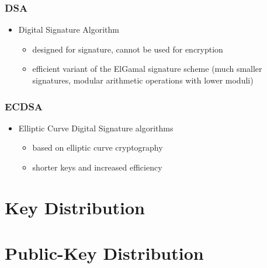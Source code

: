 \documentclass[draft]{article}
\begin{document}
\subsubsection*{DSA}
\begin{itemize}[nosep]
    \item Digital Signature Algorithm
          \begin{itemize}[nosep]
              \item designed for signature, cannot be used for encryption
              \item efficient variant of the ElGamal signature scheme (much smaller signatures, modular arithmetic operations with lower moduli)
          \end{itemize}
\end{itemize}
\subsubsection*{ECDSA}
\begin{itemize}
    \item Elliptic Curve Digital Signature algorithms
          \begin{itemize}[nosep]
              \item based on elliptic curve cryptography
              \item shorter keys and increased efficiency
          \end{itemize}
\end{itemize}
\section{Key Distribution}
\section{Public-Key Distribution}
\clearpage

\glsaddall
\printglossary[nonumberlist]
\printglossary[nonumberlist,type=\acronymtype]
\end{document}
